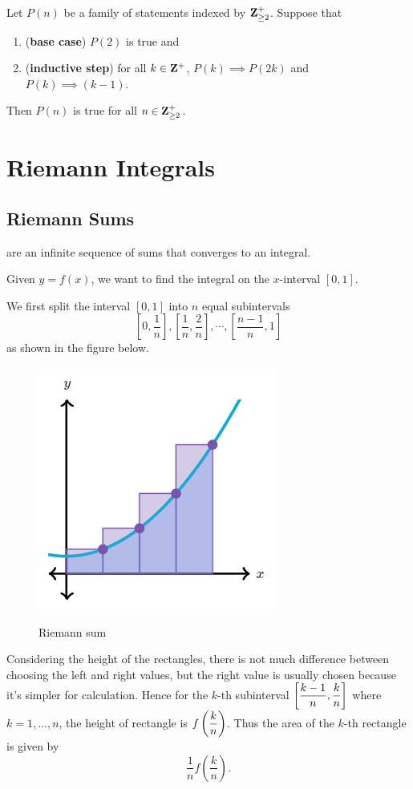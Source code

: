 \begin{theorem}
Let $P(n)$ be a family of statements indexed by $\mathbf Z^+_{\ge2}$. Suppose that
\begin{enumerate}[label=(\roman*)]
\item (\textbf{base case}) $P(2)$ is true and
\item (\textbf{inductive step}) for all $k\in\mathbf Z^+$, $P(k)\implies P(2k)$ and $P(k)\implies (k-1)$.
\end{enumerate}
Then $P(n)$ is true for all $n\in\mathbf Z^+_{\ge2}$.
\end{theorem}

\chapter{Riemann Integrals}
\section{Riemann Sums}
 are an infinite sequence of sums that converges to an integral.

Given $y=f(x)$, we want to find the integral on the $x$-interval $[0,1]$.

We first split the interval $[0,1]$ into $n$ equal subintervals \[ \left[0, \frac{1}{n}\right], \left[\frac{1}{n}, \frac{2}{n}\right], \cdots, \left[\frac{n-1}{n}, 1\right] \]
as shown in the figure below.

\begin{figure}[H]
    \centering
    \includegraphics[width=0.25\linewidth]{images/Riemanns_sums.png}
    \label{fig:riemann-sum}
    \caption{Riemann sum}
\end{figure}

Considering the height of the rectangles, there is not much difference between choosing the left and right values, but the right value is usually chosen because it's simpler for calculation. Hence for the $k$-th subinterval $\left[\dfrac{k-1}{n}, \dfrac{k}{n}\right]$ where $k=1,\dots,n$, the height of rectangle is $f\left(\dfrac{k}{n}\right)$. Thus the area of the $k$-th rectangle is given by
\[ \frac{1}{n} f\left(\frac{k}{n}\right).\]

